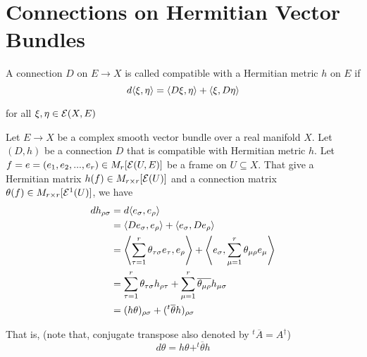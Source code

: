 \section{Connections on Hermitian Vector Bundles}

\begin{definition}
	A connection $D$ on $E \to X$ is called compatible with a Hermitian metric $h$ on $E$ if
	$$
		d \inner{\xi, \eta} = \inner{D\xi, \eta} + \inner{\xi, D \eta}
	$$
	
	for all $\xi, \eta \in \E(X, E)$
\end{definition}

\begin{remark}
	Let $E \to X$ be a complex smooth vector bundle over a real manifold $X$. Let $(D, h)$ be a connection $D$ that is compatible with Hermitian metric $h$. Let $f = e = (e_1, e_2, ..., e_r) \in M_r[\E(U, E)]$ be a frame on $U \subseteq X$. That give a Hermitian matrix $h(f) \in M_{r \times r}[\E(U)]$ and a connection matrix $\theta(f) \in M_{r \times r}[\E^1(U)]$, we have
	\begin{align*}
		d h_{\rho \sigma}
		&= d \inner{e_\sigma, e_\rho} \\
		&= \inner{D e_\sigma , e_\rho} + \inner{e_\sigma, D e_\rho} \\
		&= \inner*{\sum_{\tau=1}^r \theta_{\tau \sigma} e_\tau , e_\rho} + \inner*{e_\sigma, \sum_{\mu=1}^r \theta_{\mu \rho} e_\mu} \\
		&= \sum_{\tau=1}^r \theta_{\tau \sigma} h_{\rho \tau} + \sum_{\mu=1}^r \overline{\theta_{\mu \rho}} h_{\mu \sigma} \\
		&= (h\theta)_{\rho \sigma} + (^t\overline{\theta} h)_{\rho \sigma}
	\end{align*}
	
	That is, (note that, conjugate transpose also denoted by $^t \overline{A} = A^\dagger$)
	$$
		d \theta = h \theta + ^t \overline{\theta} h
	$$
	
\end{remark}

